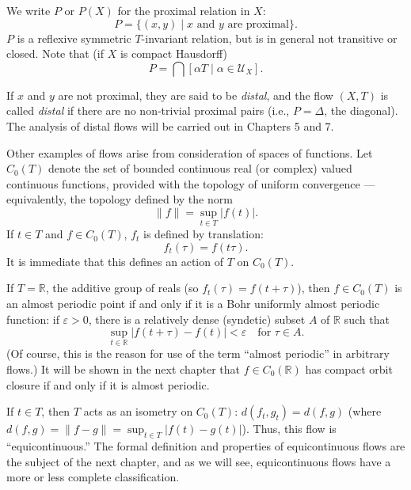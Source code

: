 We write $P$ or $P(X)$ for the proximal relation in $X$:
\[
    P = \{(x, y) \mid x \text{ and } y \text{ are proximal}\}.
\]
$P$ is a reflexive symmetric $T$-invariant relation, but is in general not transitive or closed. Note that (if $X$ is compact Hausdorff)
\[
    P = \bigcap [\alpha T \mid \alpha \in \mathcal{U}_X].
\]

If $x$ and $y$ are not proximal, they are said to be \textit{distal}, and the flow $(X, T)$ is called \textit{distal} if there are no non-trivial proximal pairs (i.e., $P = \Delta$, the diagonal). The analysis of distal flows will be carried out in Chapters 5 and 7.

Other examples of flows arise from consideration of spaces of functions. Let $C_0(T)$ denote the set of bounded continuous real (or complex) valued continuous functions, provided with the topology of uniform convergence — equivalently, the topology defined by the norm
\[
    \|f\| = \sup_{t \in T} |f(t)|.
\]
If $t \in T$ and $f \in C_0(T)$, $f_t$ is defined by translation:
\[
    f_t(\tau) = f(t\tau).
\]
It is immediate that this defines an action of $T$ on $C_0(T)$.

If $T = \mathbb{R}$, the additive group of reals (so $f_t(\tau) = f(t + \tau)$), then $f \in C_0(T)$ is an almost periodic point if and only if it is a Bohr uniformly almost periodic function: if $\varepsilon > 0$, there is a relatively dense (syndetic) subset $A$ of $\mathbb{R}$ such that
\[
    \sup_{t \in \mathbb{R}} |f(t + \tau) - f(t)| < \varepsilon \quad \text{for } \tau \in A.
\]
(Of course, this is the reason for use of the term “almost periodic” in arbitrary flows.) It will be shown in the next chapter that $f \in C_0(\mathbb{R})$ has compact orbit closure if and only if it is almost periodic.

If $t \in T$, then $T$ acts as an isometry on $C_0(T)$: $d(f_t, g_t) = d(f, g)$ (where $d(f, g) = \|f - g\| = \sup_{t \in T} |f(t) - g(t)|$). Thus, this flow is “equicontinuous.” The formal definition and properties of equicontinuous flows are the subject of the next chapter, and as we will see, equicontinuous flows have a more or less complete classification.


